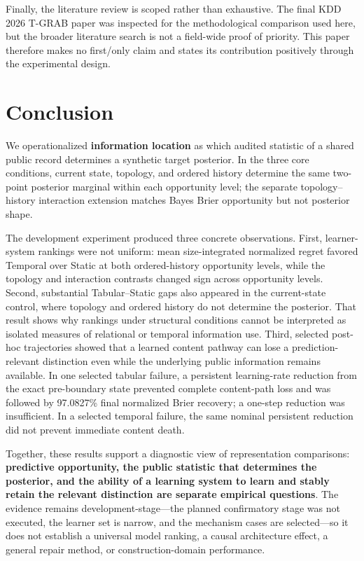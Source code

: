 \documentclass[11pt]{article}
\begin{document}
Finally, the literature review is scoped rather than exhaustive. The final KDD 2026 T-GRAB paper was inspected for the methodological comparison used here, but the broader literature search is not a field-wide proof of priority. This paper therefore makes no first/only claim and states its contribution positively through the experimental design.

\section{Conclusion}

We operationalized \textbf{information location} as which audited statistic of a shared public record determines a synthetic target posterior. In the three core conditions, current state, topology, and ordered history determine the same two-point posterior marginal within each opportunity level; the separate topology--history interaction extension matches Bayes Brier opportunity but not posterior shape.

The development experiment produced three concrete observations. First, learner-system rankings were not uniform: mean size-integrated normalized regret favored Temporal over Static at both ordered-history opportunity levels, while the topology and interaction contrasts changed sign across opportunity levels. Second, substantial Tabular--Static gaps also appeared in the current-state control, where topology and ordered history do not determine the posterior. That result shows why rankings under structural conditions cannot be interpreted as isolated measures of relational or temporal information use. Third, selected post-hoc trajectories showed that a learned content pathway can lose a prediction-relevant distinction even while the underlying public information remains available. In one selected tabular failure, a persistent learning-rate reduction from the exact pre-boundary state prevented complete content-path loss and was followed by 97.0827\% final normalized Brier recovery; a one-step reduction was insufficient. In a selected temporal failure, the same nominal persistent reduction did not prevent immediate content death.

Together, these results support a diagnostic view of representation comparisons: \textbf{predictive opportunity, the public statistic that determines the posterior, and the ability of a learning system to learn and stably retain the relevant distinction are separate empirical questions}. The evidence remains development-stage---the planned confirmatory stage was not executed, the learner set is narrow, and the mechanism cases are selected---so it does not establish a universal model ranking, a causal architecture effect, a general repair method, or construction-domain performance.
\end{document}
